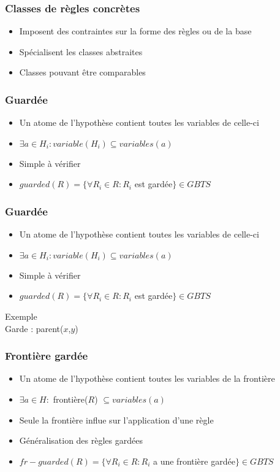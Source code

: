 
\begin{frame}
	\frametitle{Classes de règles concrètes}
	\vspace{10mm}
	\begin{itemize}
		\item Imposent des contraintes sur la forme des règles ou de la base
		\item Spécialisent les classes abstraites
		\item Classes pouvant être comparables
	\end{itemize}
\end{frame}

\begin{frame}
	\frametitle{Guardée}
	\begin{itemize}
		\item Un atome de l'hypothèse contient toutes les variables de celle-ci
		\item $\exists a \in H_i : variable(H_i) \subseteq variables(a)$
		\item Simple à vérifier
		\item $guarded(R) = \{\forall R_i \in R : R_i $ est gardée$\} \in GBTS$
	\end{itemize}
	\vspace{10mm}
\end{frame}

\begin{frame}
	\frametitle{Guardée}
	\begin{itemize}
		\item Un atome de l'hypothèse contient toutes les variables de celle-ci
		\item $\exists a \in H_i : variable(H_i) \subseteq variables(a)$
		\item Simple à vérifier
		\item $guarded(R) = \{\forall R_i \in R : R_i $ est gardée$\} \in GBTS$
	\end{itemize}
	\vspace{10mm}
	\begin{exampleblock}{Exemple}
		 \\
		Garde : parent($x$,$y$)
	\end{exampleblock}
\end{frame}

\begin{frame}
	\frametitle{Frontière gardée}
	\begin{itemize}
		\item Un atome de l'hypothèse contient toutes les variables de la frontière
		\item $\exists a \in H :$ frontière($R$) $\subseteq variables(a)$
		\item Seule la frontière influe sur l'application d'une règle
		\item Généralisation des règles gardées
		\item $fr-guarded(R) = \{\forall R_i \in R : R_i $ a une frontière gardée$\} \in GBTS$
	\end{itemize}
	\vspace{10mm}
\end{frame}

